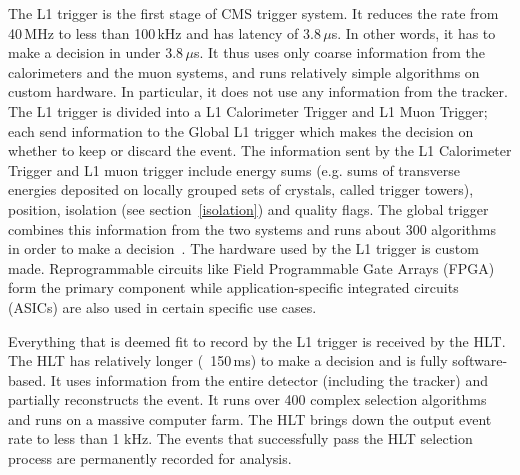 The L1 trigger is the first stage of CMS trigger system. It reduces the rate from 40\,MHz to less than 100\,kHz and has latency of 3.8\,$\mu$s. In other words, it has to make a decision in under 3.8\,$\mu$s. It thus uses only coarse information from the calorimeters and the muon systems, and runs relatively simple algorithms on custom hardware. In particular, it does not use any information from the tracker. The L1 trigger is divided into a L1 Calorimeter Trigger and L1 Muon Trigger; each send information to the Global L1 trigger which makes the decision on whether to keep or discard the event. The information sent by the L1 Calorimeter Trigger and L1 muon trigger include energy sums (e.g. sums of transverse energies deposited on locally grouped sets of crystals, called trigger towers), position, isolation (see section~\ref{isolation}) and quality flags. The global trigger combines this information from the two systems and runs about 300 algorithms in order to make a decision~\cite{trigger2}. The hardware used by the L1 trigger is custom made. Reprogrammable circuits like Field Programmable Gate Arrays (FPGA) form the primary component while application-specific integrated circuits (ASICs) are also used in certain specific use cases.  

Everything that is deemed fit to record by the L1 trigger is received by the HLT. The HLT has relatively longer (~150\,ms) to make a decision and is fully software-based. It uses information from the entire detector (including the tracker) and partially reconstructs the event. It runs over 400 complex selection algorithms and runs on a massive computer farm. The HLT brings down the output event rate to less than 1 kHz. The events that successfully pass the HLT selection process are permanently recorded for analysis. 


